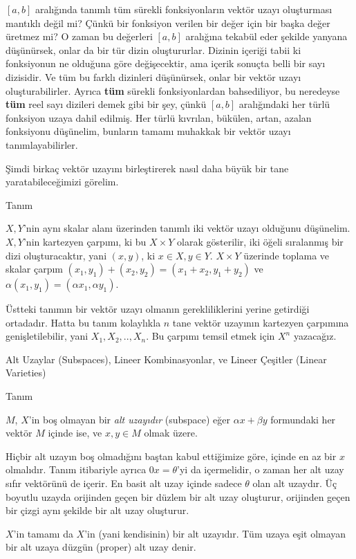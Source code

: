 \documentclass[12pt,fleqn]{article}\usepackage{../../common}
\begin{document}
$[a,b]$ aralığında tanımlı tüm sürekli fonksiyonların vektör uzayı
oluşturması mantıklı değil mi? Çünkü bir fonksiyon verilen bir değer için
bir başka değer üretmez mi? O zaman bu değerleri $[a,b]$ aralığına tekabül
eder şekilde yanyana düşünürsek, onlar da bir tür dizin
oluştururlar. Dizinin içeriği tabii ki fonksiyonun ne olduğuna göre
değişecektir, ama içerik sonuçta belli bir sayı dizisidir. Ve tüm bu farklı
dizinleri düşünürsek, onlar bir vektör uzayı oluşturabilirler. Ayrıca
\textbf{tüm} sürekli fonksiyonlardan bahsediliyor, bu neredeyse
\textbf{tüm} reel sayı dizileri demek gibi bir şey, çünkü $[a,b]$
aralığındaki her türlü fonksiyon uzaya dahil edilmiş. Her türlü kıvrılan,
bükülen, artan, azalan fonksiyonu düşünelim, bunların tamamı muhakkak bir
vektör uzayı tanımlayabilirler.

Şimdi birkaç vektör uzayını birleştirerek nasıl daha büyük bir tane
yaratabileceğimizi görelim. 

Tanım

$X,Y$'nin aynı skalar alanı üzerinden tanımlı iki vektör uzayı olduğunu
düşünelim. $X,Y$'nin kartezyen çarpımı, ki bu $X \times Y$ olarak
gösterilir, iki öğeli sıralanmış bir dizi oluşturacaktır, 
yani $(x,y)$, ki $x \in X, y \in Y$. $X \times Y$ üzerinde toplama ve
skalar çarpım $(x_1,y_1) + (x_2,y_2) = (x_1+x_2, y_1+y_2)$ ve
$\alpha(x_1,y_1) = (\alpha x_1,\alpha y_1)$. 

Üstteki tanımın bir vektör uzayı olmanın gerekliliklerini yerine getirdiği
ortadadır. Hatta bu tanım kolaylıkla $n$ tane vektör uzayının kartezyen
çarpımına genişletilebilir, yani $X_1,X_2,..,X_n$. Bu çarpımı temsil etmek
için $X^n$ yazacağız. 

Alt Uzaylar (Subspaces), Lineer Kombinasyonlar, ve Lineer Çeşitler (Linear
Varieties)

Tanım 

$M$, $X$'in boş olmayan bir {\em alt uzayıdır} (subspace) eğer
$\alpha x + \beta y$ formundaki her vektör $M$ içinde ise, ve $x,y \in M$
olmak üzere.

Hiçbir alt uzayın boş olmadığını baştan kabul ettiğimize göre, içinde en az
bir $x$ olmalıdır. Tanım itibariyle ayrıca $0 x = \theta$'yi da
içermelidir, o zaman her alt uzay sıfır vektörünü de içerir. En basit alt
uzay içinde sadece $\theta$ olan alt uzaydır. Üç boyutlu uzayda orijinden
geçen bir düzlem bir alt uzay oluşturur, orijinden geçen bir çizgi aynı
şekilde bir alt uzay oluşturur.

$X$'in tamamı da $X$'in (yani kendisinin) bir alt uzayıdır. Tüm uzaya eşit
olmayan bir alt uzaya düzgün (proper) alt uzay denir.
\end{document}
